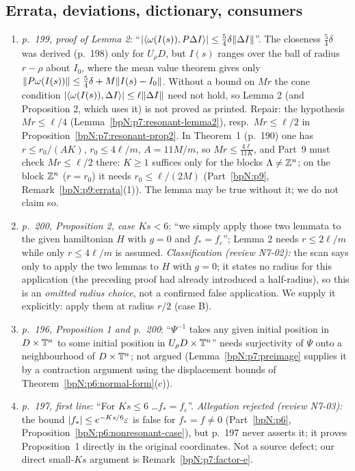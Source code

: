 \subsection{Errata, deviations, dictionary, consumers}\label{bpN:p7:s-errata}

\begin{remark}\label{bpN:p7:errata}
\begin{enumerate}[label=(\arabic*)]
\item \emph{p.~199, proof of Lemma 2}: ``$\lvert \langle\omega(I(s)),P\Delta I\rangle\rvert\le\frac54\delta\lVert \Delta I\rVert$''. The closeness $\frac54\delta$ was derived (p.~198) only for $U_\rho D$, but $I(s)$ ranges over the ball of radius $r-\rho$ about $I_0$, where the mean value theorem gives only $\lVert P\omega(I(s))\rVert\le\frac54\delta+M\lVert I(s)-I_0\rVert$. Without a bound on $Mr$ the cone condition $\lvert \langle\omega(I(s)),\Delta I\rangle\rvert\le\ell\lVert \Delta I\rVert$ need not hold, so Lemma 2 (and Proposition 2, which uses it) is not proved as printed. Repair: the hypothesis $Mr\le\ell/4$ (Lemma~\ref{bpN:p7:resonant-lemma2}), resp.\ $Mr\le\ell/2$ in Proposition~\ref{bpN:p7:resonant-prop2}. In Theorem~1 (p.~190) one has $r\le r_0/(AK)$, $r_0\le4\ell/m$, $A=11M/m$, so $Mr\le\frac{4\ell}{11K}$, and Part~9 must check $Mr\le\ell/2$ there: $K\ge1$ suffices only for the blocks $\Lambda\ne\mathbb{Z}^n$; on the block $\mathbb{Z}^n$ ($r=r_0$) it needs $r_0\le\ell/(2M)$ (Part~\ref{bpN:p9}, Remark~\ref{bpN:p9:errata}(1)). The lemma may be true without it; we do not claim so.
\item \emph{p.~200, Proposition 2, case $Ks<6$}: ``we simply apply those two lemmata to the given hamiltonian $H$ with $g=0$ and $f_*=f_\varepsilon$''; Lemma 2 needs $r\le2\ell/m$ while only $r\le4\ell/m$ is assumed. \emph{Classification (review N7-02):} the scan says only to apply the two lemmas to $H$ with $g=0$; it states no radius for this application (the preceding proof had already introduced a half-radius), so this is an \emph{omitted radius choice}, not a confirmed false application. We supply it explicitly: apply them at radius $r/2$ (case B).
\item \emph{p.~196, Proposition 1 and p.~200}: ``$\Psi^{-1}$ takes any given initial position in $D\times\mathbb{T}^n$ to some initial position in $U_\rho D\times\mathbb{T}^n$'' needs surjectivity of $\Psi$ onto a neighbourhood of $D\times\mathbb{T}^n$; not argued (Lemma~\ref{bpN:p7:preimage} supplies it by a contraction argument using the displacement bounds of Theorem~\ref{bpN:p6:normal-form}(c)).
\item \emph{p.~197, first line}: ``For $Ks\le6$ \dots $f_*=f_\varepsilon$''. \emph{Allegation rejected (review N7-03):} the bound $\lvert f_*\rvert\le e^{-Ks/6}\varepsilon$ is false for $f_*=f\ne0$ (Part~\ref{bpN:p6}, Proposition~\ref{bpN:p6:nonresonant-case}), but p.~197 never asserts it; it proves Proposition~1 directly in the original coordinates. Not a source defect; our direct small-$Ks$ argument is Remark~\ref{bpN:p7:factor-e}.

\end{enumerate}
\end{remark}
